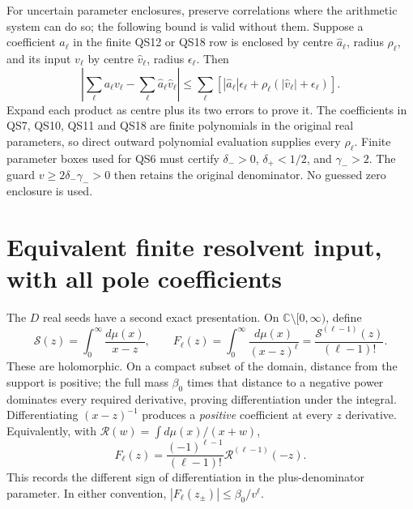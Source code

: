 \documentclass[11pt]{article}
\newcommand{\C}{\mathbb C}
\begin{document}
For uncertain parameter enclosures, preserve correlations
where the arithmetic system can do so; the following bound
is valid without them. Suppose a coefficient \(a_\ell\)
in the finite QS12 or QS18 row is enclosed by
centre \(\widehat a_\ell\), radius \(\rho_\ell\), and its
input \(v_\ell\) by centre \(\widehat v_\ell\), radius
\(\epsilon_\ell\). Then
\begin{equation}\tag{QS23}
 \left|\sum_\ell a_\ell v_\ell-
              \sum_\ell\widehat a_\ell\widehat v_\ell\right|
 \le\sum_\ell\left[
 |\widehat a_\ell|\epsilon_\ell+
                  \rho_\ell(|\widehat v_\ell|+\epsilon_\ell)\right].
\end{equation}
Expand each product as centre plus its two errors to prove it.
The coefficients in QS7, QS10, QS11 and QS18 are finite
polynomials in the original real parameters, so direct
outward polynomial evaluation supplies every \(\rho_\ell\).
Finite parameter boxes used for QS6 must certify
\(\delta_->0\), \(\delta_+<1/2\), and \(\gamma_->2\).
The guard \(v\ge2\delta_-\gamma_->0\) then retains the
original denominator. No guessed zero enclosure is used.

\section{Equivalent finite resolvent input, with all pole coefficients}

The \(D\) real seeds have a second exact presentation.
On \(\C\setminus[0,\infty)\), define
\begin{equation}\tag{QS24}
 \mathcal S(z)=\int_0^\infty\frac{d\mu(x)}{x-z},
 \qquad F_\ell(z)=\int_0^\infty\frac{d\mu(x)}{(x-z)^\ell}
       =\frac{\mathcal S^{(\ell-1)}(z)}{(\ell-1)!}.
\end{equation}
These are holomorphic. On a compact subset of the domain,
distance from the support is positive; the full mass
\(\beta_0\) times that distance to a negative power dominates
every required derivative, proving differentiation under
the integral. Differentiating \((x-z)^{-1}\) produces a
\emph{positive} coefficient at every \(z\) derivative.
Equivalently, with
\(\mathcal R(w)=\int d\mu(x)/(x+w)\),
\begin{equation}\tag{QS25}
 F_\ell(z)=\frac{(-1)^{\ell-1}}{(\ell-1)!}
                \mathcal R^{(\ell-1)}(-z).
\end{equation}
This records the different sign of differentiation in the
plus-denominator parameter. In either convention,
\(|F_\ell(z_\pm)|\le\beta_0/v^\ell\).
\end{document}
